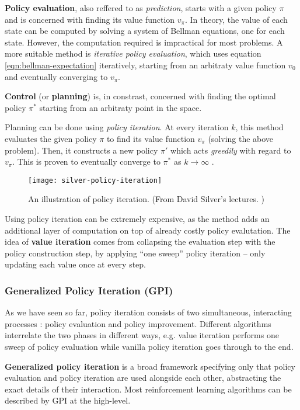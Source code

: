 \textbf{Policy evaluation}, also reffered to as \emph{prediction}, starts with a given policy $\pi$ and is concerned with finding its value function $v_{\pi}$.
In theory, the value of each state can be computed by solving a system of Bellman equations, one for each state.
However, the computation required is impractical for most problems.
A more suitable method is \emph{iterative policy evaluation}, which uses equation \ref{eqn:bellman-expectation} iteratively, starting from an arbitraty value function $v_0$ and eventually converging to $v_{\pi}$.

\textbf{Control} (or \textbf{planning}) is, in constrast, concerned with finding the optimal policy $\pi^{*}$ starting from an arbitraty point in the space.

Planning can be done using \emph{policy iteration}.
At every iteration $k$, this method evaluates the given policy $\pi$ to find its value function $v_{\pi}$ (solving the above problem).
Then, it constructs a new policy $\pi'$ which acts \emph{greedily} with regard to $v_{\pi}$.
This is proven to eventually converge to $\pi^*$ as $k \to \infty$ \cite{rlai}.

\begin{figure}[h]
    \caption{An illustration of policy iteration. (From David Silver's lectures. \cite{silver-lectures})}
    \centering
    \texttt{[image: silver-policy-iteration]}
\end{figure}

Using policy iteration can be extremely expensive, as the method adds an additional layer of computation on top of already costly policy evalutation.
The idea of \textbf{value iteration} comes from collapsing the evaluation step with the policy construction step, by applying ``one sweep'' policy iteration -- only updating each value once at every step.

\subsubsection{Generalized Policy Iteration (GPI)}
As we have seen so far, policy iteration consists of two simultaneous, interacting processes \cite{rlai}: policy evaluation and policy improvement.
Different algorithms interrelate the two phases in different ways, e.g. value iteration performs one sweep of policy evaluation while vanilla policy iteration goes through to the end.

\textbf{Generalized policy iteration} is a broad framework specifying only that policy evaluation and policy iteration are used alongside each other, abstracting the exact details of their interaction.
Most reinforcement learning algorithms can be described by GPI at the high-level.

